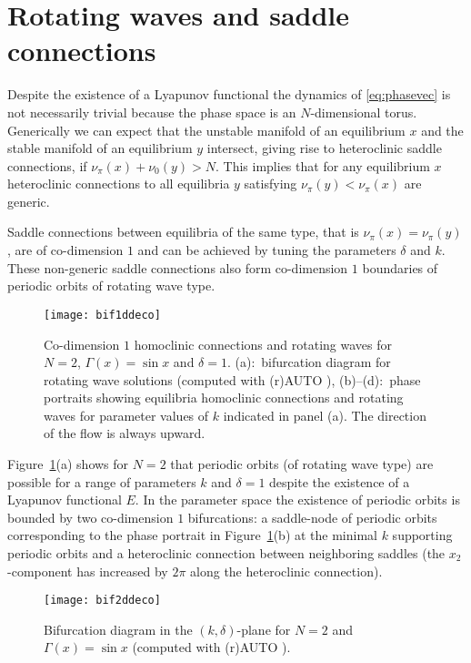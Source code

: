 \documentclass[aps,pre,twocolumn,a4paper,showkeys,showpacs]{revtex4}\usepackage{color}
\theoremstyle{plain}
\theoremstyle{plain}
\begin{document}
\section{Rotating waves and saddle connections}

\label{sec:rot}Despite the existence of a Lyapunov functional the dynamics of
\eqref{eq:phasevec} is not necessarily trivial because the phase space is an
$N$-dimensional torus. Generically we can expect that the unstable manifold of
an equilibrium $x$ and the stable manifold of an equilibrium $y$ intersect,
giving rise to heteroclinic saddle connections, if $\nu_{\pi}(x)+\nu_{0}(y)>N$. This implies that for any equilibrium $x$ heteroclinic connections to
all equilibria $y$ satisfying $\nu_{\pi}(y)<\nu_{\pi}(x)$ are generic.

Saddle connections between equilibria of the same type, that is $\nu_{\pi
}(x)=\nu_{\pi}(y)$, are of co-dimension $1$ and can be achieved by tuning the
parameters $\delta$ and $k$. These non-generic saddle connections also form
co-dimension $1$ boundaries of periodic orbits of rotating wave type.
\begin{figure}[ptb]
\texttt{[image: bif1ddeco]}\caption{Co-dimension $1$
homoclinic connections and rotating waves for $N=2$, $\Gamma(x)=\sin x$ and
$\delta=1$. (a):~bifurcation diagram for rotating wave solutions (computed
with (r)AUTO \cite{DCFKSW98,S07}), (b)--(d):~phase portraits showing
equilibria homoclinic connections and rotating waves for parameter values of
$k$ indicated in panel (a). The direction of the flow is always upward.}\label{fig:bifpp2}\end{figure}

Figure~\ref{fig:bifpp2}(a) shows for $N=2$ that periodic orbits (of rotating
wave type) are possible for a range of parameters $k$ and $\delta=1$ despite
the existence of a Lyapunov functional $E$. In the parameter space the
existence of periodic orbits is bounded by two co-dimension $1$ bifurcations:
a saddle-node of periodic orbits corresponding to the phase portrait in
Figure~\ref{fig:bifpp2}(b) at the minimal $k$ supporting periodic orbits and a
heteroclinic connection between neighboring saddles (the $x_{2}$-component has
increased by $2\pi$ along the heteroclinic connection). \begin{figure}[ptb]
\texttt{[image: bif2ddeco]}\caption{Bifurcation diagram
in the $(k,\delta)$-plane for $N=2$ and $\Gamma(x)=\sin x$ (computed with
(r)AUTO \cite{DCFKSW98,S07}).}\label{fig:bif2}\end{figure}
\end{document}
